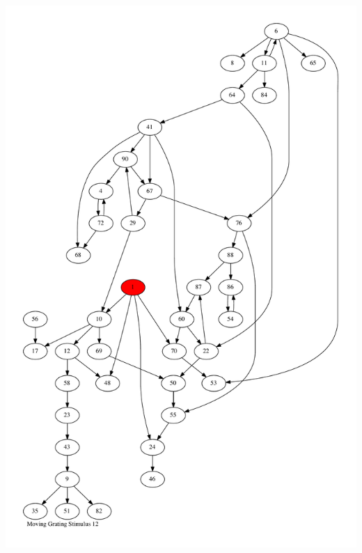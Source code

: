 \documentclass{article}
\begin{document}
\newpage
\includegraphics[max height=\textheight,max width=\textwidth]{stim_mov_grat/stim12_pp.pdf}
\end{document}
